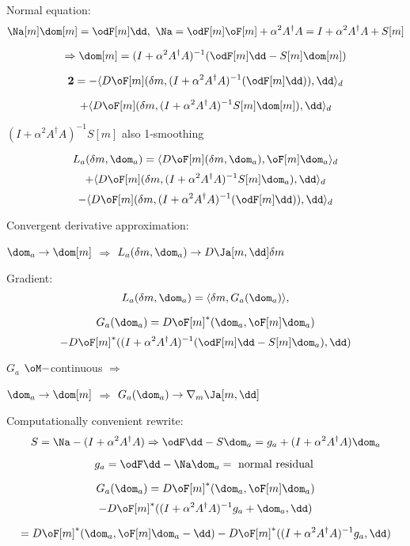 Normal equation:
\[
\Na[m] \dom[m] = \odF[m] \dd, \,\,\Na = \odF[m]\oF[m] +\alpha^2  A^{\dagger}A = I + \alpha^2 A^{\dagger}A + S[m]
\]

\[
\Rightarrow \dom[m] = (I + \alpha^2 A^{\dagger}A)^{-1}(\odF[m]\dd -S[m]\dom[m]) 
\]

\[
{\bf 2} = -\langle D\oF[m](\delta m,(I + \alpha^2 A^{\dagger}A)^{-1}(\odF[m]\dd)),\dd\rangle_d 
\]

\[
+ \langle D\oF[m](\delta m, (I+\alpha^2 A^{\dagger}A)^{-1}S[m]\dom[m]),\dd\rangle_d
\]

$(I+\alpha^2 A^{\dagger}A)^{-1}S[m]$ also 1-smoothing 

\[
L_a (\delta m,\dom_a) = \langle D\oF[m](\delta m,\dom_a),\oF[m]\dom_a\rangle_d 
\]
\[
+ \langle D\oF[m](\delta m, (I+\alpha^2 A^{\dagger}A)^{-1}S[m]\dom_a),\dd\rangle_d
\]
\[
-\langle D\oF[m](\delta m,(I + \alpha^2 A^{\dagger}A)^{-1}(\odF[m]\dd)),\dd\rangle_d 
\]

Convergent derivative approximation:

$\dom_a \rightarrow \dom[m]$ $\Rightarrow$ $L_a(\delta m, \dom_a) \rightarrow D\Ja[m,\dd]\delta m$

Gradient:
\[
L_a(\delta m, \dom_a) = \langle \delta m, G_a(\dom_a) \rangle,
\]

\[
G_a(\dom_a) = D\oF[m]^*(\dom_a,\oF[m]\dom_a) 
\]
\[
- D\oF[m]^*((I+\alpha^2 A^{\dagger}A)^{-1}(\odF[m]\dd -S[m]\dom_a),\dd) 
\]

$G_a$ $\oM-$continuous $\Rightarrow$ 

$\dom_a \rightarrow \dom[m]$ $\Rightarrow$ $G_a(\dom_a) \rightarrow \nabla_m \Ja[m,\dd]$

Computationally convenient rewrite:
\[
S = \Na - (I+\alpha^2 A^{\dagger}A) \Rightarrow \odF\dd-S\dom_a = g_a + (I+\alpha^2 A^{\dagger}A)\dom_a
\]

\[
g_a = \odF \dd - \Na\dom_a = \mbox{ normal residual }
\]

\[
G_a(\dom_a) = D\oF[m]^*(\dom_a,\oF[m]\dom_a) 
\]
\[
- D\oF[m]^*((I+\alpha^2 A^{\dagger}A)^{-1}g_a +\dom_a,\dd) 
\]

\[
= D\oF[m]^*(\dom_a,\oF[m]\dom_a-\dd) - D\oF[m]^*((I+\alpha^2 A^{\dagger}A)^{-1}g_a,\dd)
\]
